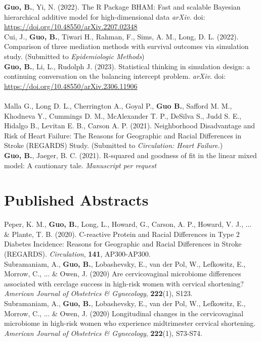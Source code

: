 \textbf{Guo, B.}, Yi, N. (2022). The R Package BHAM: Fast and scalable Bayesian hierarchical additive model for high-dimensional data  {\it arXiv}. doi: \url{https://doi.org/10.48550/arXiv.2207.02348}\\

Cui, J., \textbf{Guo, B.}, Tiwari H., Rahman, F., Sims, A. M., Long, D. L. (2022). Comparison of three mediation methods with survival outcomes via simulation study. (Submitted to \textit{Epidemiologic Methods})\\

\textbf{Guo, B.}, Li, L., Rudolph J. (2023). Statistical thinking in simulation design: a continuing conversation on the balancing intercept problem. {\it arXiv}. doi: \url{ 	
https://doi.org/10.48550/arXiv.2306.11906}\\\\

Malla G., Long D. L., Cherrington A., Goyal P., \textbf{Guo B.}, Safford M. M., Khodneva Y., Cummings D. M., McAlexander T. P., DeSilva S., Judd S. E., Hidalgo B., Levitan E. B., Carson A. P. (2021). Neighborhood Disadvantage and Risk of Heart Failure: The Reasons for Geographic and Racial Differences in Stroke (REGARDS) Study. (Submitted to \textit{Circulation: Heart Failure.})\\

\textbf{Guo, B.}, Jaeger, B. C. (2021). R-squared and goodness of fit in the linear mixed model: A cautionary tale. {\it Manuscript per request}\\


\section{Published Abstracts}
Peper, K. M., \textbf{Guo, B.}, Long, L., Howard, G., Carson, A. P., Howard, V. J., ... \& Plante, T. B.  (2020). C-reactive Protein and Racial Differences in Type 2 Diabetes Incidence: Reasons for Geographic and Racial Differences in Stroke (REGARDS). \textit{Circulation}, {\bf 141}, AP300-AP300. \\

Subramaniam, A., \textbf{Guo, B.}, Lobashevsky, E., van der Pol, W., Lefkowitz, E., Morrow, C., ... \& Owen, J.  (2020) Are cervicovaginal microbiome differences associated with cerclage success in high-risk women with cervical shortening? \textit{American Journal of Obstetrics \& Gynecology}, {\bf 222}(1), S123.\\

Subramaniam, A., \textbf{Guo, B.}, Lobashevsky, E., van der Pol, W., Lefkowitz, E., Morrow, C., ... \& Owen, J.  (2020)  Longitudinal changes in the cervicovaginal microbiome in high-risk women who experience midtrimester cervical shortening. \textit{American Journal of Obstetrics \& Gynecology}, {\bf 222}(1), S73-S74.\\

